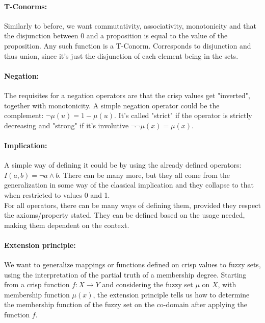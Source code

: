 \paragraph{T-Conorms:} Similarly to before, we want commutativity, associativity, monotonicity and that the disjunction between 0 and a proposition is equal to the value of the proposition. Any such function is a T-Conorm. Corresponds to disjunction and thus union, since it's just the disjunction of each element being in the sets.\\

\paragraph{Negation:} The requisites for a negation operators are that the crisp values get "inverted", together with monotonicity. A simple negation operator could be the complement: $\neg \mu(u) = 1 - \mu(u)$. It's called "strict" if the operator is strictly decreasing and "strong" if it's involutive $\neg \neg \mu(x) = \mu(x)$.\\

\paragraph{Implication:} A simple way of defining it could be by using the already defined operators: $I(a,b) = \neg a \wedge b$. There can be many more, but they all come from the generalization in some way of the classical implication and they collapse to that when restricted to values 0 and 1.\\

For all operators, there can be many ways of defining them, provided they respect the axioms/property stated. They can be defined based on the usage needed, making them dependent on the context.\\

\paragraph{Extension principle:} We want to generalize mappings or functions defined on crisp values to fuzzy sets, using the interpretation of the partial truth of a membership degree. Starting from a crisp function $f: X \rightarrow Y$ and considering the fuzzy set $\mu$ on $X$, with membership function $\mu(x)$, the extension principle tells us how to determine the membership function of the fuzzy set on the co-domain after applying the function $f$.\\

